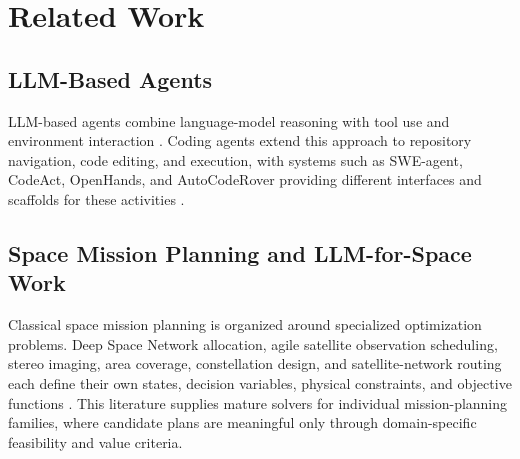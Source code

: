 \documentclass[]{mosi}
\begin{document}
\section{Related Work}

\subsection{LLM-Based Agents}



LLM-based agents combine language-model reasoning with tool use and environment interaction \citep{yao2022react,wangvoyager}. Coding agents extend this approach to repository navigation, code editing, and execution, with systems such as SWE-agent, CodeAct, OpenHands, and AutoCodeRover providing different interfaces and scaffolds for these activities \citep{yang2024sweagent,wang2024codeact,wang2024openhands,zhang2024autocoderover}.

\subsection{Space Mission Planning and LLM-for-Space Work}

Classical space mission planning is organized around specialized optimization problems. Deep Space Network allocation, agile satellite observation scheduling, stereo imaging, area coverage, constellation design, and satellite-network routing each define their own states, decision variables, physical constraints, and objective functions \citep{johnston2006automating,goh2022satnet,lemaitrea2002selecting,he2018improved,zezhong2023multiple,lee2024satellite,lyu2024dynamic}. This literature supplies mature solvers for individual mission-planning families, where candidate plans are meaningful only through domain-specific feasibility and value criteria.
\end{document}
